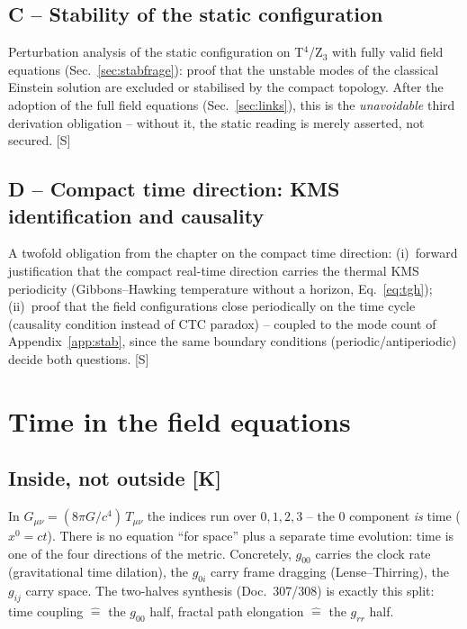 \documentclass[11pt]{report}
\begin{document}
\section{C -- Stability of the static configuration}

Perturbation analysis of the static configuration on T$^4$/Z$_3$
with fully valid field equations (Sec.~\ref{sec:stabfrage}): proof that the unstable
modes of the classical Einstein solution are excluded or stabilised
by the compact topology. After the adoption of the full field
equations (Sec.~\ref{sec:links}), this is the \emph{unavoidable} third
derivation obligation -- without it, the static reading is merely
asserted, not secured. [S]

\section{D -- Compact time direction: KMS identification and
causality}

A twofold obligation from the chapter on the compact time
direction: (i)~forward justification that the compact real-time
direction carries the thermal KMS periodicity (Gibbons--Hawking
temperature without a horizon, Eq.~\eqref{eq:tgh});
(ii)~proof that the field configurations close periodically on the
time cycle (causality condition instead of CTC paradox) -- coupled
to the mode count of Appendix~\ref{app:stab}, since the same boundary
conditions (periodic/antiperiodic) decide both questions. [S]

\chapter{Time in the field equations}

\section{Inside, not outside [K]}

In $G_{\mu\nu} = (8\pi G/c^4)\,T_{\mu\nu}$ the indices run over
$0,1,2,3$ -- the $0$ component \emph{is} time ($x^0 = ct$). There is
no equation \enquote{for space} plus a separate time evolution:
time is one of the four directions of the metric. Concretely,
$g_{00}$ carries the clock rate (gravitational time dilation), the
$g_{0i}$ carry frame dragging (Lense--Thirring), the $g_{ij}$ carry
space. The two-halves synthesis (Doc.~307/308) is exactly this
split: time coupling $\hat{=}$ the $g_{00}$ half, fractal path
elongation $\hat{=}$ the $g_{rr}$ half.
\end{document}
